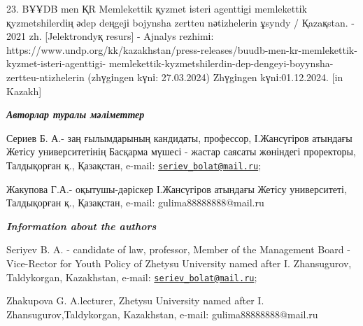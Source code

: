 23. BҰҰDB men ҚR Memlekettіk қyzmet іsterі agenttіgі memlekettіk
қyzmetshіlerdің әdep deңgejі bojynsha zertteu nәtizhelerіn ұsyndy /
Қazaқstan. - 2021 zh. {[}Jelektrondyқ resurs{]} - Ajnalys rezhimі:
https://www.undp.org/kk/kazakhstan/press-releases/buudb-men-kr-memlekettik-kyzmet-isteri-agenttigi-
memlekettik-kyzmetshilerdin-dep-dengeyi-boyynsha-zertteu-ntizhelerin
(zhүgіngen kүnі: 27.03.2024) Zhүgіngen kүnі:01.12.2024. {[}in Kazakh{]}

\emph{{\bfseries Авторлар туралы мәліметтер}}

Сериев Б. А.- заң ғылымдарының кандидаты, профессор, І.Жансүгіров
атындағы Жетісу университетінің Басқарма мүшесі - жастар саясаты
жөніндегі проректоры, Талдықорған қ., Қазақстан, e-mail:
\href{mailto:seriev_bolat@mail.ru}{\nolinkurl{seriev\_bolat@mail.ru}};

Жакупова Г.А.- оқытушы-дәріскер І.Жансүгіров атындағы Жетісу
университеті, Талдықорған қ., Қазақстан, e-mail: gulima88888888@mail.ru

\emph{{\bfseries Information about the authors}}

Seriyev B. A. - candidate of law, professor, Member of the Management
Board - Vice-Rector for Youth Policy of Zhetysu University named after
I. Zhansugurov, Taldykorgan, Kazakhstan, e-mail:
\href{mailto:seriev_bolat@mail.ru}{\nolinkurl{seriev\_bolat@mail.ru}};

Zhakupova G. A.lecturer, Zhetysu University named after I.
Zhansugurov,Taldykorgan, Kazakhstan, e-mail: gulima88888888@mail.ru
